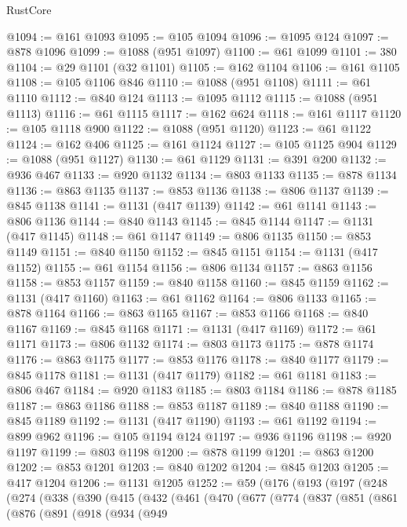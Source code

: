 \begin{lexlean}{RustCore}
\begin{coremodule}
{\begin{coremodule}
{{{{{{{{{{{{{{{{{{{{{{{{{{{{{{{{{{{{{{{{{{{{{{{@1094 := @161 @1093
@1095 := @105 @1094
@1096 := @1095 @124
@1097 := @878 @1096
@1099 := @1088 (@951 @1097)
@1100 := @61 @1099
@1101 := 380
@1104 := @29 @1101 (@32 @1101)
@1105 := @162 @1104
@1106 := @161 @1105
@1108 := @105 @1106 @846
@1110 := @1088 (@951 @1108)
@1111 := @61 @1110
@1112 := @840 @124
@1113 := @1095 @1112
@1115 := @1088 (@951 @1113)
@1116 := @61 @1115
@1117 := @162 @624
@1118 := @161 @1117
@1120 := @105 @1118 @900
@1122 := @1088 (@951 @1120)
@1123 := @61 @1122
@1124 := @162 @406
@1125 := @161 @1124
@1127 := @105 @1125 @904
@1129 := @1088 (@951 @1127)
@1130 := @61 @1129
@1131 := @391 @200
@1132 := @936 @467
@1133 := @920 @1132
@1134 := @803 @1133
@1135 := @878 @1134
@1136 := @863 @1135
@1137 := @853 @1136
@1138 := @806 @1137
@1139 := @845 @1138
@1141 := @1131 (@417 @1139)
@1142 := @61 @1141
@1143 := @806 @1136
@1144 := @840 @1143
@1145 := @845 @1144
@1147 := @1131 (@417 @1145)
@1148 := @61 @1147
@1149 := @806 @1135
@1150 := @853 @1149
@1151 := @840 @1150
@1152 := @845 @1151
@1154 := @1131 (@417 @1152)
@1155 := @61 @1154
@1156 := @806 @1134
@1157 := @863 @1156
@1158 := @853 @1157
@1159 := @840 @1158
@1160 := @845 @1159
@1162 := @1131 (@417 @1160)
@1163 := @61 @1162
@1164 := @806 @1133
@1165 := @878 @1164
@1166 := @863 @1165
@1167 := @853 @1166
@1168 := @840 @1167
@1169 := @845 @1168
@1171 := @1131 (@417 @1169)
@1172 := @61 @1171
@1173 := @806 @1132
@1174 := @803 @1173
@1175 := @878 @1174
@1176 := @863 @1175
@1177 := @853 @1176
@1178 := @840 @1177
@1179 := @845 @1178
@1181 := @1131 (@417 @1179)
@1182 := @61 @1181
@1183 := @806 @467
@1184 := @920 @1183
@1185 := @803 @1184
@1186 := @878 @1185
@1187 := @863 @1186
@1188 := @853 @1187
@1189 := @840 @1188
@1190 := @845 @1189
@1192 := @1131 (@417 @1190)
@1193 := @61 @1192
@1194 := @899 @962
@1196 := @105 @1194 @124
@1197 := @936 @1196
@1198 := @920 @1197
@1199 := @803 @1198
@1200 := @878 @1199
@1201 := @863 @1200
@1202 := @853 @1201
@1203 := @840 @1202
@1204 := @845 @1203
@1205 := @417 @1204
@1206 := @1131 @1205
@1252 := @59
    (@176
      (@193
        (@197
          (@248
            (@274
              (@338
                (@390
                  (@415
                    (@432
                      (@461
                        (@470
                          (@677
                            (@774
                              (@837
                                (@851
                                  (@861
                                    (@876
                                      (@891
                                        (@918
                                          (@934
                                            (@949
}}}}}}}}}}}}}}}}}}}}}}}}}}}}}}}}}}}}}}}}}}}}}}}
\end{coremodule}}
\end{coremodule}
\end{lexlean}
